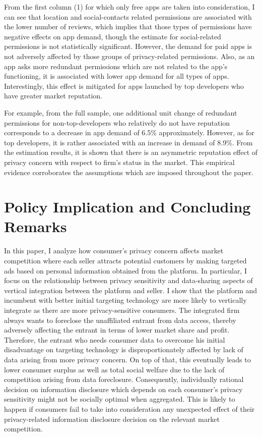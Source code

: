 \documentclass[12pt]{article}
\begin{document}
From the first column (1) for which only free apps are taken into consideration, I can see that location and social-contacts related permissions are associated with the lower number of reviews, which implies that those types of permissions have negative effects on app demand, though the estimate for social-related permissions is not statistically significant. However, the demand for paid apps is not adversely affected by those groups of privacy-related permissions. Also, as an app asks more redundant permissions which are not related to the app's functioning, it is associated with lower app demand for all types of apps. Interestingly, this effect is mitigated for apps launched by top developers who have greater market reputation. 

For example, from the full sample, one additional unit change of redundant permissions for non-top-developers who relatively do not have reputation corresponds to a decrease in app demand of 6.5\% approximately. However, as for top developers, it is rather associated with an increase in demand of 8.9\%. From the estimation results, it is shown that there is an asymmetric reputation effect of privacy concern with respect to firm's status in the market. This empirical evidence corroborates the assumptions which are imposed throughout the paper. 


\section{Policy Implication and Concluding Remarks}
In this paper, I analyze how consumer's privacy concern affects market competition where each seller attracts potential customers by making targeted ads based on personal information obtained from the platform. In particular, I focus on the relationship between privacy sensitivity and data-sharing aspects of vertical integration between the platform and seller. I show that the platform and incumbent with better initial targeting technology are more likely to vertically integrate as there are more privacy-sensitive consumers. The integrated firm always wants to foreclose the unaffiliated entrant from data access, thereby adversely affecting the entrant in terms of lower market share and profit. Therefore, the entrant who needs consumer data to overcome his initial disadvantage on targeting technology is disproportionately affected by lack of data arising from more privacy concern. On top of that, this eventually leads to lower consumer surplus as well as total social welfare due to the lack of competition arising from data foreclosure. Consequently, individually rational decision on information disclosure which depends on each consumer's privacy sensitivity might not be socially optimal when aggregated. This is likely to happen if consumers fail to take into consideration any unexpected effect of their privacy-related information disclosure decision on the relevant market competition. 
\end{document}

